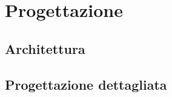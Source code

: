 \section{Progettazione}\label{progettazione}

\subsection{Architettura}\label{architettura}

\subsection{Progettazione dettagliata}\label{progettazione-dettagliata}
